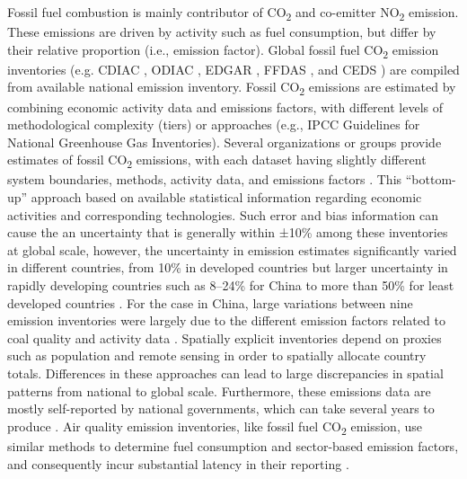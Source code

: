 Fossil fuel combustion is mainly contributor of CO\textsubscript{2} and co-emitter NO\textsubscript{2} emission. These emissions are driven by activity such as fuel consumption, but differ by their relative proportion (i.e., emission factor)\citep{miyazaki2023predictability}. Global fossil fuel CO\textsubscript{2} emission inventories (e.g. CDIAC \citep{andres2012synthesis}, ODIAC \citep{oda2011very, oda2018open}, EDGAR \citep{crippa2020high}, FFDAS \citep{asefi2014multiyear}, and CEDS \citep{hoesly2018historical}) are compiled from available national emission inventory. Fossil CO\textsubscript{2} emissions are estimated by combining economic activity data and emissions factors, with different levels of methodological complexity (tiers) or approaches (e.g., IPCC Guidelines for National Greenhouse Gas Inventories). Several organizations or groups provide estimates of fossil CO\textsubscript{2} emissions, with each dataset having slightly different system boundaries, methods, activity data, and emissions factors \citep{andrew2020comparison}. This “bottom-up” approach based on available statistical information regarding economic activities and corresponding technologies. Such error and bias information can cause the an uncertainty that is generally within ±10\% among these inventories at global scale, however, the uncertainty in emission estimates significantly varied in different countries, from 10\% in developed countries\citep{essd-11-1783-2019} but larger uncertainty in rapidly developing countries such as 8–24\% for China \citep{han2020evaluating, marland2008uncertainties} to more than 50\% for least developed countries \citep{andres2016gridded, essd-11-1783-2019, oda2018open}. For the case in China, large variations between nine emission inventories were largely due to the different emission factors related to coal quality and activity data \citep{han2020evaluating,miyazaki2023predictability}. Spatially explicit inventories depend on proxies such as population and remote sensing in order to spatially allocate country totals. Differences in these approaches can lead to large discrepancies in spatial patterns from national to global scale. Furthermore, these emissions data are mostly self-reported by national governments, which can take several years to produce \citep{marland2008uncertainties}. Air quality emission inventories, like fossil fuel CO\textsubscript{2} emission, use similar methods to determine fuel consumption and sector-based emission factors, and consequently incur substantial latency in their reporting \citep{miyazaki2023predictability}.\par

